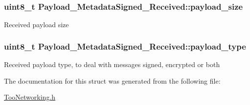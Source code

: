 \subsubsection[{\texorpdfstring{payload\+\_\+size}{payload_size}}]{\setlength{\rightskip}{0pt plus 5cm}uint8\+\_\+t Payload\+\_\+\+Metadata\+Signed\+\_\+\+Received\+::payload\+\_\+size}\hypertarget{structPayload__MetadataSigned__Received_a3d2d5a1f14940bbc0435dc1fec8fb238}{}\label{structPayload__MetadataSigned__Received_a3d2d5a1f14940bbc0435dc1fec8fb238}
Received payload size 
\subsubsection[{\texorpdfstring{payload\+\_\+type}{payload_type}}]{\setlength{\rightskip}{0pt plus 5cm}uint8\+\_\+t Payload\+\_\+\+Metadata\+Signed\+\_\+\+Received\+::payload\+\_\+type}\hypertarget{structPayload__MetadataSigned__Received_aad832d1e40428c42d4cac30012eacc02}{}\label{structPayload__MetadataSigned__Received_aad832d1e40428c42d4cac30012eacc02}
Received payload type, to deal with messages signed, encrypted or both 

The documentation for this struct was generated from the following file\+:\begin{DoxyCompactItemize}
\item 
\hyperlink{TooNetworking_8h}{Too\+Networking.\+h}\end{DoxyCompactItemize}
